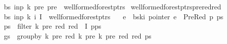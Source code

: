 \begin{isabellebody}
\ \ \ {\isachardoublequoteopen}{\isacharparenleft}{\kern0pt}bs{\isacharcomma}{\kern0pt}\ inp{\isacharcomma}{\kern0pt}\ k{\isacharprime}{\kern0pt}{\isacharcomma}{\kern0pt}\ pre{\isacharcomma}{\kern0pt}\ {\isacharbraceleft}{\kern0pt}pre{\isacharbraceright}{\kern0pt}{\isacharparenright}{\kern0pt}\ {\isasymin}\ wellformed{\isacharunderscore}{\kern0pt}forest{\isacharunderscore}{\kern0pt}ptrs{\isachardoublequoteclose}%
\isadelimproof
%
\endisadelimproof
%
\isatagproof
%
\endisatagproof
{\isafoldproof}%
%
\isadelimproof
\isanewline
%
\endisadelimproof
{}\isamarkupfalse%
\ wellformed{\isacharunderscore}{\kern0pt}forest{\isacharunderscore}{\kern0pt}ptrs{\isacharunderscore}{\kern0pt}prered{\isacharunderscore}{\kern0pt}red{\isacharcolon}{\kern0pt}\isanewline
\ \ \ {\isachardoublequoteopen}{\isacharparenleft}{\kern0pt}bs{\isacharcomma}{\kern0pt}\ inp{\isacharcomma}{\kern0pt}\ k{\isacharcomma}{\kern0pt}\ i{\isacharcomma}{\kern0pt}\ I{\isacharparenright}{\kern0pt}\ {\isasymin}\ wellformed{\isacharunderscore}{\kern0pt}forest{\isacharunderscore}{\kern0pt}ptrs{\isachardoublequoteclose}\isanewline
\ \ \ {\isachardoublequoteopen}e\ {\isacharequal}{\kern0pt}\ bs{\isacharbang}{\kern0pt}k{\isacharbang}{\kern0pt}i{\isachardoublequoteclose}\ {\isachardoublequoteopen}pointer\ e\ {\isacharequal}{\kern0pt}\ PreRed\ p\ ps{\isachardoublequoteclose}\isanewline
\ \ \ {\isachardoublequoteopen}ps{\isacharprime}{\kern0pt}\ {\isacharequal}{\kern0pt}\ filter\ {\isacharparenleft}{\kern0pt}{\isasymlambda}{\isacharparenleft}{\kern0pt}k{\isacharprime}{\kern0pt}{\isacharcomma}{\kern0pt}\ pre{\isacharcomma}{\kern0pt}\ red{\isacharparenright}{\kern0pt}{\isachardot}{\kern0pt}\ red\ {\isasymnotin}\ I{\isacharparenright}{\kern0pt}\ {\isacharparenleft}{\kern0pt}p{\isacharhash}{\kern0pt}ps{\isacharparenright}{\kern0pt}{\isachardoublequoteclose}\isanewline
\ \ \ {\isachardoublequoteopen}gs\ {\isacharequal}{\kern0pt}\ group{\isacharunderscore}{\kern0pt}by\ {\isacharparenleft}{\kern0pt}{\isasymlambda}{\isacharparenleft}{\kern0pt}k{\isacharprime}{\kern0pt}{\isacharcomma}{\kern0pt}\ pre{\isacharcomma}{\kern0pt}\ red{\isacharparenright}{\kern0pt}{\isachardot}{\kern0pt}\ {\isacharparenleft}{\kern0pt}k{\isacharprime}{\kern0pt}{\isacharcomma}{\kern0pt}\ pre{\isacharparenright}{\kern0pt}{\isacharparenright}{\kern0pt}\ {\isacharparenleft}{\kern0pt}{\isasymlambda}{\isacharparenleft}{\kern0pt}k{\isacharprime}{\kern0pt}{\isacharcomma}{\kern0pt}\ pre{\isacharcomma}{\kern0pt}\ red{\isacharparenright}{\kern0pt}{\isachardot}{\kern0pt}\ red{\isacharparenright}{\kern0pt}\ ps{\isacharprime}{\kern0pt}{\isachardoublequoteclose}\isanewline

\end{isabellebody}
